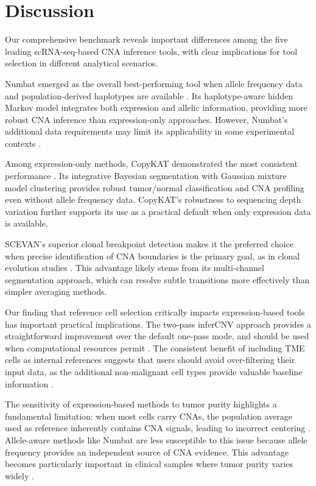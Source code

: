 \documentclass[11pt]{article}
\begin{document}
\section{Discussion}

Our comprehensive benchmark reveals important differences among the five leading scRNA-seq-based CNA inference tools, with clear implications for tool selection in different analytical scenarios.

Numbat emerged as the overall best-performing tool when allele frequency data and population-derived haplotypes are available \citep{Gao2023}. Its haplotype-aware hidden Markov model integrates both expression and allelic information, providing more robust CNA inference than expression-only approaches. However, Numbat's additional data requirements may limit its applicability in some experimental contexts \citep{Fan2018,Serin2019}.

Among expression-only methods, CopyKAT demonstrated the most consistent performance \citep{Gao2021}. Its integrative Bayesian segmentation with Gaussian mixture model clustering provides robust tumor/normal classification and CNA profiling even without allele frequency data. CopyKAT's robustness to sequencing depth variation further supports its use as a practical default when only expression data is available.

SCEVAN's superior clonal breakpoint detection \citep{DeFalco2023} makes it the preferred choice when precise identification of CNA boundaries is the primary goal, as in clonal evolution studies \citep{McGranahan2017}. This advantage likely stems from its multi-channel segmentation approach, which can resolve subtle transitions more effectively than simpler averaging methods.

Our finding that reference cell selection critically impacts expression-based tools has important practical implications. The two-pass inferCNV approach provides a straightforward improvement over the default one-pass mode, and should be used when computational resources permit \citep{Patel2014,Tirosh2016}. The consistent benefit of including TME cells as internal references suggests that users should avoid over-filtering their input data, as the additional non-malignant cell types provide valuable baseline information \citep{Lambrechts2018}.

The sensitivity of expression-based methods to tumor purity highlights a fundamental limitation: when most cells carry CNAs, the population average used as reference inherently contains CNA signals, leading to incorrect centering \citep{Fan2018}. Allele-aware methods like Numbat are less susceptible to this issue because allele frequency provides an independent source of CNA evidence. This advantage becomes particularly important in clinical samples where tumor purity varies widely \citep{Aran2015}.
\end{document}
